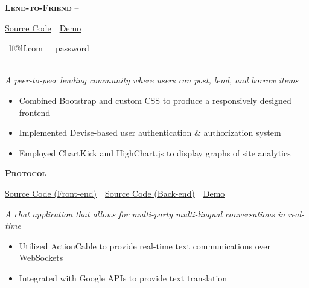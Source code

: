 \documentclass[11pt,letterpaper,english]{article}
\begin{document}
\textbf{\textsc{Lend-to-Friend}} 
--\begin{small}
\href{https://github.com/jdbean/lend-to-friend}{Source Code}~\color{darkgray}{|}~\href{https://pacific-earth-11787.herokuapp.com/}{Demo}
\end{small}
\begin{scriptsize}
\color{gray}
\faUser~lf@lf.com~~\faKey~password
\end{scriptsize}\\
\textit{A peer-to-peer lending community where users can post, lend, and borrow items}
\begin{itemize}
\item Combined Bootstrap and custom CSS to produce a responsively designed frontend
\item Implemented Devise-based user authentication \& authorization system
\item Employed ChartKick and HighChart.js to display graphs of site analytics
\end{itemize}
\smallskip

\textbf{\textsc{Protocol}} 
--\begin{small}
\href{https://github.com/jdbean/protocol-frontend}{Source Code (Front-end)}~\color{darkgray}{|}~\href{https://github.com/jdbean/protocol-backend}{Source Code (Back-end)}~\color{darkgray}{|}~\href{https://www.youtube.com/watch?v=vMI0HT0UjEM}{Demo}\\
\end{small}
\textit{A chat application that allows for multi-party multi-lingual conversations in real-time}
\begin{itemize}
\item Utilized ActionCable to provide real-time text communications over WebSockets
\item Integrated with Google APIs to provide text translation
\end{itemize}
\smallskip
\end{document}
